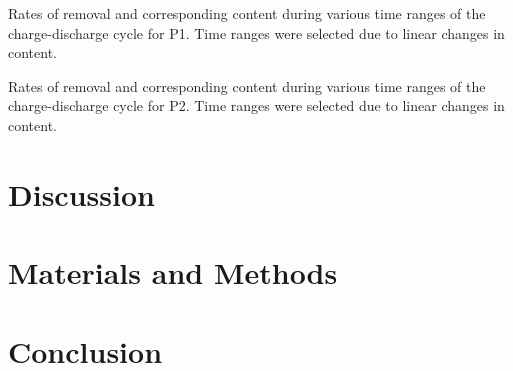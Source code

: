 \documentclass{article}
\begin{document}
\begin{table}
  \centering
  
  \caption{Rates of  removal and corresponding  content during various time ranges of the
    charge-discharge cycle for P1. Time ranges were selected due to linear
    changes in  content.}
  \label{table:rates}
\end{table}

\begin{table}
  \centering
  
  \caption{Rates of  removal and corresponding  content during various time ranges of the
    charge-discharge cycle for P2. Time ranges were selected due to linear
    changes in  content.}
  \label{table:ratesp2}
\end{table}




\section{Discussion}

\Blindtext

\section{Materials and Methods}

\blindtext

\section{Conclusion}

\blindtext
\end{document}
